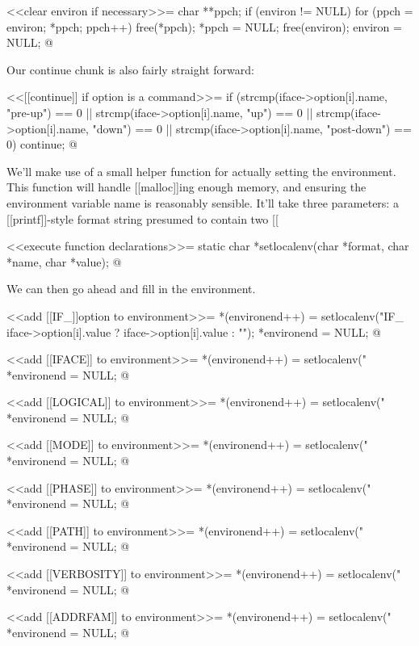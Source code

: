 \documentclass{article}
\begin{document}
<<clear environ if necessary>>=
{
	char **ppch;
	if (environ != NULL) {
		for (ppch = environ; *ppch; ppch++) {
			free(*ppch);
			*ppch = NULL;
		}
		free(environ);
		environ = NULL;
	}
}
@

Our continue chunk is also fairly straight forward:

<<[[continue]] if option is a command>>=
if (strcmp(iface->option[i].name, "pre-up") == 0
    || strcmp(iface->option[i].name, "up") == 0
    || strcmp(iface->option[i].name, "down") == 0
    || strcmp(iface->option[i].name, "post-down") == 0)
{
	continue;
}
@

We'll make use of a small helper function for actually setting the
environment. This function will handle [[malloc]]ing enough memory, and
ensuring the environment variable name is reasonably sensible. It'll
take three parameters: a [[printf]]-style format string presumed to
contain two [[%

<<execute function declarations>>=
static char *setlocalenv(char *format, char *name, char *value);
@

We can then go ahead and fill in the environment.

<<add [[IF_]]option to environment>>=
*(environend++) = setlocalenv("IF_%
                              iface->option[i].value ? iface->option[i].value : "");
*environend = NULL;
@

<<add [[IFACE]] to environment>>=
*(environend++) = setlocalenv("%
*environend = NULL;
@

<<add [[LOGICAL]] to environment>>=
*(environend++) = setlocalenv("%
*environend = NULL;
@

<<add [[MODE]] to environment>>=
*(environend++) = setlocalenv("%
*environend = NULL;
@

<<add [[PHASE]] to environment>>=
*(environend++) = setlocalenv("%
*environend = NULL;
@

<<add [[PATH]] to environment>>=
*(environend++) = setlocalenv("%
*environend = NULL;
@

<<add [[VERBOSITY]] to environment>>=
*(environend++) = setlocalenv("%
*environend = NULL;
@

<<add [[ADDRFAM]] to environment>>=
*(environend++) = setlocalenv("%
*environend = NULL;
@
\end{document}
